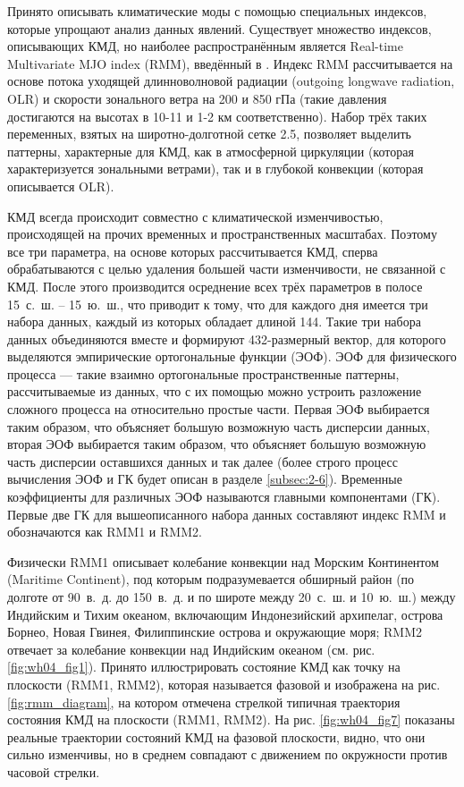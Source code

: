 
Принято описывать климатические моды с помощью специальных индексов, которые упрощают анализ данных явлений. Существует множество индексов, описывающих КМД, но наиболее распространённым является Real-time Multivariate MJO index (RMM), введённый в \cite{Wheeler_Hendon_2004}. Индекс RMM рассчитывается на основе потока уходящей длинноволновой радиации (outgoing longwave radiation, OLR) и скорости зонального ветра на 200 и 850 гПа (такие давления достигаются на высотах в 10-11 и 1-2 км соответственно). Набор трёх таких переменных, взятых на широтно-долготной сетке 2.5\textdegree{}\textdegree, позволяет выделить паттерны, характерные для КМД, как в атмосферной циркуляции (которая характеризуется зональными ветрами), так и в глубокой конвекции (которая описывается OLR).

КМД всегда происходит совместно с климатической изменчивостью, происходящей на прочих временных и пространственных масштабах. Поэтому все три параметра, на основе которых рассчитывается КМД, сперва обрабатываются с целью удаления большей части изменчивости, не связанной с КМД. После этого производится осреднение всех трёх параметров в полосе 15\textdegree~с.~ш. – 15\textdegree~ю.~ш., что приводит к тому, что для каждого дня имеется три набора данных, каждый из которых обладает длиной 144. Такие три набора данных объединяются вместе и формируют 432-размерный вектор, для которого выделяются эмпирические ортогональные функции (ЭОФ). ЭОФ для физического процесса --- такие взаимно ортогональные пространственные паттерны, рассчитываемые из данных, что с их помощью можно устроить разложение сложного процесса на относительно простые части. Первая ЭОФ выбирается таким образом, что объясняет большую возможную часть дисперсии данных, вторая ЭОФ выбирается таким образом, что объясняет большую возможную часть дисперсии оставшихся данных и так далее \cite[Гл. 6]{Zhang_et_al_2020} (более строго процесс вычисления ЭОФ и ГК будет описан в разделе \ref{subsec:2-6}). Временные коэффициенты для различных ЭОФ называются главными компонентами (ГК). Первые две ГК для вышеописанного набора данных составляют индекс RMM и обозначаются как RMM1 и RMM2.

Физически RMM1 описывает колебание конвекции над Морским Континентом (Maritime Continent), под которым подразумевается обширный район (по долготе от 90\textdegree~в.~д. до 150\textdegree~в.~д. и по широте между 20\textdegree~с.~ш. и 10\textdegree~ю.~ш.) между Индийским и Тихим океаном, включающим Индонезийский архипелаг, острова Борнео, Новая Гвинея, Филиппинские острова и окружающие моря; RMM2 отвечает за колебание конвекции над Индийским океаном (см. рис. \ref{fig:wh04_fig1}). Принято иллюстрировать состояние КМД как точку на плоскости (RMM1, RMM2), которая называется фазовой и изображена на рис. \ref{fig:rmm_diagram}, на котором отмечена стрелкой типичная траектория состояния КМД на плоскости (RMM1, RMM2). На рис. \ref{fig:wh04_fig7} показаны реальные траектории состояний КМД на фазовой плоскости, видно, что они сильно изменчивы, но в среднем совпадают с движением по окружности против часовой стрелки.

